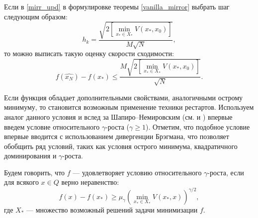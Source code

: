     \begin{remark}
        Если в \eqref{mirr_upd} в формулировке теоремы \ref{vanilla_mirror} выбрать шаг следующим образом:
        \begin{equation} \label{mirr_step}
            h_{k} = \frac{\sqrt{2 \left[\min\limits_{x_* \in X_*}{V(x_*, x_0)}\right] }}{M\sqrt{N}},
        \end{equation}
        то можно выписать такую оценку скорости сходимости:
        \begin{equation} \label{mirr_est}
            f(\widehat{x_N}) - f(x_*) \leq \frac{M\sqrt{2 \left[\min\limits_{x_* \in X_*}{V(x_*, x_0)}\right]}}{\sqrt{N}}.
        \end{equation}
    \end{remark}
    Если функция обладает дополнительными свойствами, аналогичными острому минимуму,  то становится возможным применение техники рестартов. Используем аналог данного условия и вслед за Шапиро–Немировским (см. \cite{shapiro_2005} и \cite{shapiro_2021} ) впервые введем условие относительного $\gamma$-роста ($\gamma \geq 1$). Отметим, что подобное условие впервые вводится с использованием дивергенции Брэгмана, что позволяет обобщить ряд условий, таких как условия острого минимума, квадратичного доминирования и $\gamma$-роста.
    \begin{definition}
       Будем говорить, что $f$ --- удовлетворяет условию относительного $\gamma$-роста, если для всякого $x \in Q$ верно неравенство:
       \begin{equation} \label{gamma-growth}
           f(x) - f(x_*) \geq \mu_{\gamma}\left(\min_{x_* \in X_*}{V(x_*,x)}\right)^{\gamma/2},
       \end{equation}
       где $X_*$ --- множество возможный решений задачи минимизации $f$. 
    \end{definition}
    
